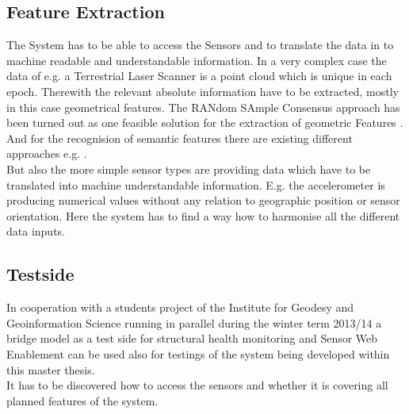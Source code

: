 \subsection{Feature Extraction}
The System has to be able to access the Sensors and to translate the data in to machine readable and understandable information. In a very complex case the data of e.g. a Terrestrial Laser Scanner  is a point cloud which is unique in each epoch. Therewith the relevant absolute information have to be extracted, mostly in this case geometrical features. The RANdom SAmple Consensus  approach has been turned out as one feasible solution for the extraction of geometric Features \citep{schnabel_efficient_2007}. And for the recognision of semantic features there are existing different approaches e.g. \citep{schnabel_efficient_2010}\citep{gumhold_feature_2001}.\\
But also the more simple sensor types are providing data which have to be translated into machine understandable information. E.g. the accelerometer is producing numerical values without any relation to geographic position or sensor orientation. Here the system has to find a way how to harmonise all the different data inputs.
\subsection{Testside}
In cooperation with a students project of the Institute for Geodesy and Geoinformation Science  running in parallel during the winter term 2013/14 a bridge model as a test side for structural health monitoring and Sensor Web Enablement can be used also for testings of the system being developed within this master thesis.\\
It has to be discovered how to access the sensors and whether it is covering all planned features of the system.